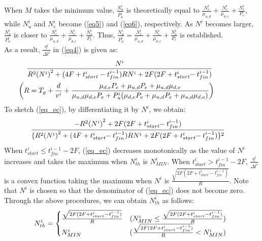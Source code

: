 \documentclass{ieeeaccess}
\begin{document}
%
When $M$ takes the minimum value, $\frac{N_u^i}{P_u^i}$ is theoretically equal to $\frac{N_e^i}{\mu_{u,d}}+\frac{N_e^i}{\mu_{d,e}}+\frac{N_e^i}{P_e}$, while $N_u^i$ and $N_e^i$ become (\ref{eq5}) and (\ref{eq6}), respectively.
%
As $N^i$ becomes larger, $\frac{N_u^i}{P_u^i}$ is closer to $\frac{N_e^i}{\mu_{u,d}}+\frac{N_e^i}{\mu_{d,e}}+\frac{N_e^i}{P_e}$.
%
Thus, $\frac{N_u^i}{P_u^i}=\frac{N_e^i}{\mu_{u,d}}+\frac{N_e^i}{\mu_{d,e}}+\frac{N_e^i}{P_e}$ is established.\\
%
As a result, $\frac{\eta^{i}}{{\Delta{t}}^i}$ in (\ref{eq4}) is given as:
%
\begin{align}
&\hspace{-0.2cm}\frac{N^i}{R^2{(N^i)}^2+(4F+t_{start}^i-t_{fin}^{i-1})R{N^i}+2F(2F+t_{start}^i\hspace{-1mm}-t_{fin}^{i-1})}\hspace{1cm}\label{eq_ec}\\
&\hspace{-0.6cm}\biggl(R=T_g+\frac{d}{v^i}+\frac{\mu_{d,e}P_e+\mu_{u,d}P_e+\mu_{u,d}\mu_{d,e}}{\mu_{u,d}\mu_{d,e}P_e+P_u^i(\mu_{d,e}P_e+\mu_{u,d}P_e+\mu_{u,d}\mu_{d,e})}\biggr)\nonumber
\end{align}
%
To sketch (\ref{eq_ec}), by differentiating it by $N^i$, we obtain:
%
\begin{align}
\hspace{-4mm} \frac{-{R^2{(N^i)}^2}+2F(2F+t_{start}^i\hspace{-1mm}-t_{fin}^{i-1})}{\{R^2{(N^i)}^2+(4F+t_{start}^i\hspace{-1mm}-t_{fin}^{i-1})R{N^i}+2F(2F+t_{start}^i\hspace{-1mm}-t_{fin}^{i-1})\}^2}
\end{align}
%
When $t_{start}^i \leq{t_{fin}^{i-1}-2F}$, (\ref{eq_ec}) decreases monotonically as the value of $N^i$ increases and takes the maximum when $N_{th}^i$ is $N_{MIN}^i$.
%
When $t_{start}^i >{t_{fin}^{i-1}-2F}$, $\frac{\eta^{i}}{{\Delta{t}}^i}$ is a convex function taking the maximum when $N^i$ is $\frac{\sqrt{2F(2F+t_{start}^i-t_{fin}^{i-1})}}{R}$.
%
Note that $N^i$ is chosen so that the denominator of (\ref{eq_ec}) does not become zero.
%
Through the above procedures, we can obtain $N_{th}^i$ as follows:
%
\begin{align}
 \hspace{-1.5mm} N_{th}^i= \begin{cases}
    \frac{\sqrt{2F(2F+t_{start}^i-t_{fin}^{i-1})}}{R} & ({N_{MIN}^i}\leq{\frac{\sqrt{2F(2F+t_{start}^i-t_{fin}^{i-1})}}{R}}) \\
    N_{MIN}^i& (\frac{\sqrt{2F(2F+t_{start}^i-t_{fin}^{i-1})}}{R}<{N_{MIN}^i})
  \end{cases}
\end{align}
\end{document}
